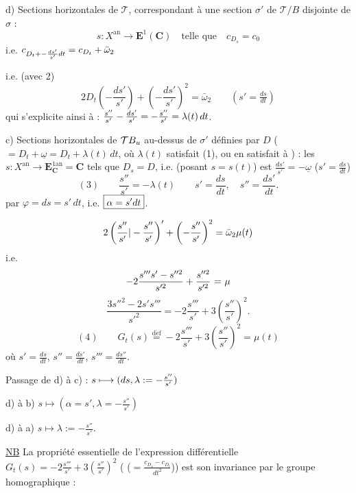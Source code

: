 d) Sections horizontales de $\mathcal T$,  correspondant à une section $\sigma'$ de $\mathcal T/B$ disjointe de $\sigma$ :
\[
s:X^{\mathrm{an}}\longrightarrow\mathbf E^1(\mathbf C)\quad\text{telle que}\quad c_{D_s}=c_0
\]
i.e. $c_{D_t{{+}}-\frac{ds'}{s'}{dt}}=c_{D_t}+\bar\omega_2$

i.e. (avec 2)
\[
2D_t\left(-\frac{ds'}{s'}\right)+\left(-\frac{ds'}{s'}\right)^2=\bar\omega_2\qquad(s'=\tfrac{ds}{dt})
\]
qui s'explicite ainsi à  : ${{\frac{s''}{s'}}}-\frac{ds'}{s'}=-\frac{s''}{s'}=\lambda(t)\,dt$.

c) Sections horizontales de $\mathcal T{{B_u}}$ au-dessus de $\sigma'$ définies par $D$ ($=D_t+\underline\omega=D_t+\lambda(t)\,dt$, où $\lambda(t)$ satisfait (1), ou en satisfait à ) : les $s:X^{\mathrm{an}}\longrightarrow\mathbf E^{1\mathrm{an}}_{\mathbf C}=\mathbf C$ tels que $D_s=D$, i.e. (posant $s=s(t)$) est $\frac{ds'}{s'}=-\underline\omega$ ($s'=\frac{ds}{dt}$)
\[
(3)\qquad\frac{s''}{s'}=-\lambda(t)\qquad s'=\frac{ds}{dt},\quad s''=\frac{ds'}{dt}.
\]
 par $\varphi=ds=s'\,dt$, i.e. $\boxed{\alpha=s'{{dt}}}$.

\[
2\left({\frac{s''}{s'}|-\frac{s''}{s'}}\right)'+\left(-\frac{s''}{s'}\right)^2={{\bar\omega_2}}\mu(t)
\]
i.e.
\[
-2\frac{s'''s'-s''^2}{s'^2}+\frac{s''^2}{s'^2}\ \deleted{\unsure{=}}\ \mu
\]
\[
\frac{3s''^2-2s's'''}{s'^2}=-2\frac{s'''}{s'}+3\left(\frac{s''}{s'}\right)^2.
\]
\[
(4)\qquad\boxed{G_t(s)\overset{\mathrm{d\acute ef}}{=}-2\frac{s'''}{s'}+3\left(\frac{s''}{s'}\right)^2=\mu(t)}
\]
où $s'=\frac{ds}{dt}$, $s''=\frac{ds'}{dt}$, $s'''=\frac{ds''}{dt}$.

Passage de d) à c) : $s\longmapsto({{ds}},\lambda:=-\frac{s''}{s'})$

\unsure{---} d) à b) $s\longmapsto(\alpha=s',\lambda=-\frac{s''}{s'})$

\unsure{---} d) à a) $s\longmapsto\lambda:=-\frac{s''}{s'}$.

\uline{NB} La propriété essentielle de l'expression différentielle $G_t(s)=-2\frac{s'''}{s'}+3(\frac{s''}{s'})^2$  ( ($=\frac{c_{D_s}-c_{D_t}}{dt^2}$)) est son invariance par le groupe homographique :

